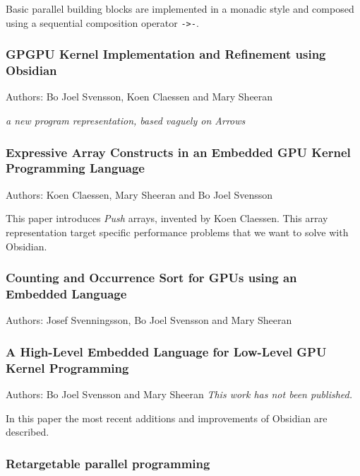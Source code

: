 \documentclass[a4paper]{book}
\newcommand{\paperPAPP}{GPGPU Kernel Implementation and Refinement using Obsidian}
\newcommand{\paperEXPRESSIVE}{Expressive Array Constructs in an Embedded GPU Kernel Programming Language}
\newcommand{\paperCSORT}{Counting and Occurrence Sort for GPUs using an Embedded Language}
\newcommand{\paperHL}{A High-Level Embedded Language for Low-Level GPU Kernel Programming}
\begin{document}
Basic parallel building blocks are implemented in a monadic style and 
composed using a sequential composition operator {\tt ->-}. 

\subsubsection{\paperPAPP}

Authors: Bo Joel Svensson, Koen Claessen and Mary Sheeran \newline

\vspace{5mm}

\emph{a new program representation, based vaguely on Arrows} 


\subsubsection{\paperEXPRESSIVE}

Authors: Koen Claessen, Mary Sheeran and  Bo Joel Svensson \newline

\vspace{5mm}

This paper introduces {\em Push} arrays, invented by Koen Claessen. This 
array representation target specific performance problems that we want 
to solve with Obsidian. 


\subsubsection{\paperCSORT} 

Authors: Josef Svenningsson, Bo Joel Svensson and Mary Sheeran \newline

\vspace{5mm}

\subsubsection{\paperHL}

Authors: Bo Joel Svensson and Mary Sheeran \newline
\noindent \emph{This work has not been published.}
\vspace{5mm} 

\noindent 

In this paper the most recent additions and improvements of Obsidian are 
described. 

\subsubsection{Retargetable parallel programming} 
\end{document}
